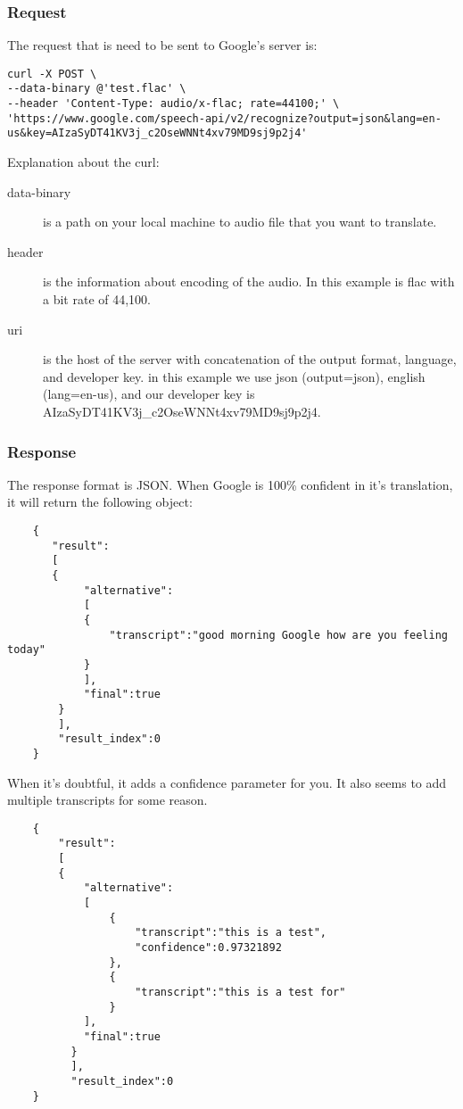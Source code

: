 \subsubsection{Request}
The request that is need to be sent to Google's server is:
\begin{lstlisting}
curl -X POST \
--data-binary @'test.flac' \
--header 'Content-Type: audio/x-flac; rate=44100;' \
'https://www.google.com/speech-api/v2/recognize?output=json&lang=en-us&key=AIzaSyDT41KV3j_c2OseWNNt4xv79MD9sj9p2j4'
\end{lstlisting}
Explanation about the curl:
\begin{description}
	\item [data-binary] is a path on your local machine to audio file that you want to translate.
	\item [header] is the information about encoding of the audio. In this example is flac with a bit rate of 44,100.
	\item [uri] is the host of the server with concatenation of the output format, language, and developer key. in this example we use json (output=json), english (lang=en-us), and our developer key is AIzaSyDT41KV3j\_c2OseWNNt4xv79MD9sj9p2j4.
\end{description}
\subsubsection{Response}
The response format is JSON. When Google is 100\% confident in it's translation, it will return the following object:
\begin{lstlisting}
	{
	   "result":
	   [
	   {
	   		"alternative":
	   		[
	   		{
	   			"transcript":"good morning Google how are you feeling today"
	   		}
	   		],
	   		"final":true
	   	}
	   	],
	   	"result_index":0
	}
\end{lstlisting}
When it's doubtful, it adds a confidence parameter for you. It also seems to add multiple transcripts for some reason.
\begin{lstlisting}
	{
		"result":
		[
		{
			"alternative":
			[
				{
					"transcript":"this is a test",
					"confidence":0.97321892
		        },
		        {
		        	"transcript":"this is a test for"
		        }
	      	],
	      	"final":true
	      }
	      ],
	      "result_index":0
	}
\end{lstlisting}